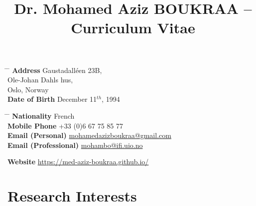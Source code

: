 \documentclass[10pt]{article} %
\begin{document}

\title{Dr. Mohamed Aziz BOUKRAA -- Curriculum Vitae} %




\parbox{0.5\textwidth}{ %
\begin{tabbing} %
\hspace{2.5cm} \= \hspace{4cm} \= \kill %
{\bf Address} \> Gaustadalléen 23B,\\ %
\> Ole-Johan Dahls hus,\\
 Oslo, Norway \\ %
{\bf Date of Birth} \>  December 11$^{th}$, 1994 \\%
\end{tabbing}}
\hspace{0.5cm}
\parbox{0.5\textwidth}{ %
\begin{tabbing} %
\hspace{3.5cm} \= \hspace{4cm} \= \kill %
{\bf Nationality} \> French \\%
{\bf Mobile Phone} \> +33 (0)6 67 75 85 77 \\ %
{\bf Email (Personal)} \> \href{mailto:mohamedazizboukraa@gmail.com}{mohamedazizboukraa@gmail.com} \\ %
{\bf Email (Professional)} \> \href{mailto:mohambo@ifi.uio.no}{mohambo@ifi.uio.no} \\ %
\end{tabbing}}

\vspace{-0.7cm}
{\bf Website}  \href{https://med-aziz-boukraa.github.io/}{https://med-aziz-boukraa.github.io/} \\ %

\section{Research Interests}
\end{document}
